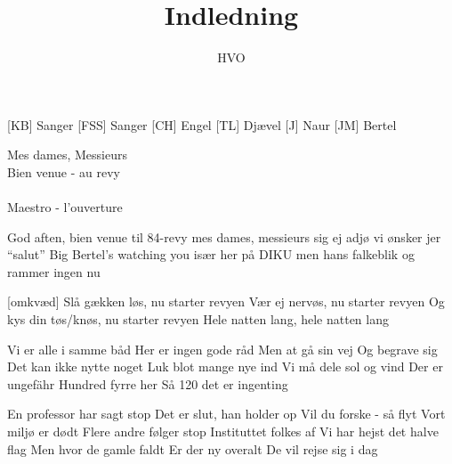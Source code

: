 \documentclass[a4paper,11pt]{article}
\title{Indledning}
\author{HVO}
\begin{document}
\maketitle

\begin{roles}
[KB] Sanger
[FSS] Sanger
[CH] Engel
[TL] Djævel
[J] Naur
[JM] Bertel
\end{roles}

\begin{sketch}


 Mes dames, Messieurs\\
  Bien venue - au revy\\
  \\
  Maestro - l'ouverture


\end{sketch}

\begin{song}

 God aften, bien venue
  til 84-revy
  mes dames, messieurs
  sig ej adjø
  vi ønsker jer ``salut''
  Big Bertel's watching you
  især her på DIKU
  men hans falkeblik
  og rammer ingen nu

[omkvæd] Slå gækken løs, nu starter revyen
  Vær ej nervøs, nu starter revyen
  Og kys din tøs/knøs, nu starter revyen
  Hele natten lang, hele natten lang


  Vi er alle i samme båd
  Her er ingen gode råd
  Men at gå sin vej
  Og begrave sig
  Det kan ikke nytte noget
  Luk blot mange nye ind
  Vi må dele sol og vind
  Der er ungefähr
  Hundred fyrre her
  Så 120 det er ingenting


  En professor har sagt stop
  Det er slut, han holder op
  Vil du forske - så flyt
  Vort miljø er dødt
  Flere andre følger stop
  Instituttet folkes af
  Vi har hejst det halve flag
  Men hvor de gamle faldt
  Er der ny overalt
  De vil rejse sig i dag



\end{song}
\end{document}
